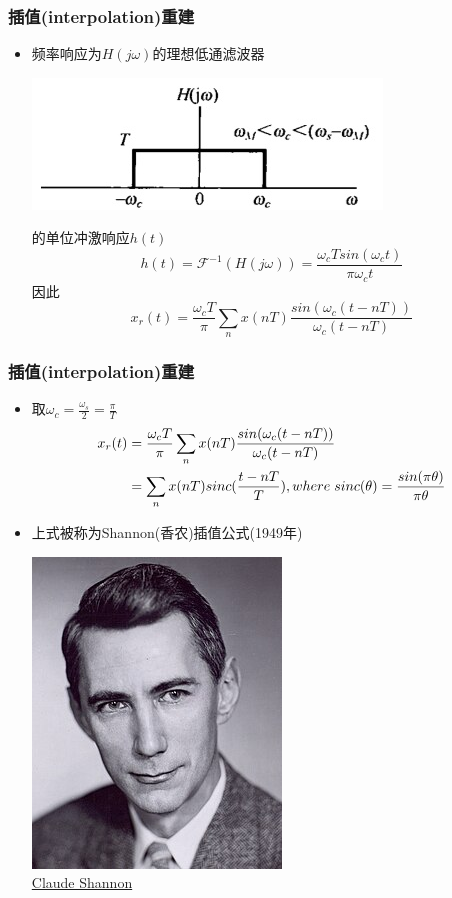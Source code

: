\documentclass[CJKutf8,dvipsnames,table]{beamer}
\begin{document}
\begin{CJK*}{UTF8}{song}
  \begin{frame}
    \frametitle{插值(interpolation)重建}
    \begin{itemize}
    \item 频率响应为$H(j\omega)$的理想低通滤波器
	    \begin{center}
    	\includegraphics[scale=.3]{ss-c-f7-4d}
    	\end{center}
 	的单位冲激响应$h(t)$
	\[
		h(t)=\mathscr{F}^{-1}(H(j\omega))=\frac{\omega_c T sin(\omega_c t)}{\pi\omega_c t}
	\]
	因此
	\[
		x_r(t) = \frac{\omega_c T}{\pi} \sum_n x(nT)\frac{sin(\omega_c(t-nT))}{\omega_c (t-nT)}
	\]
    \end{itemize}
  \end{frame}   
  
  \begin{frame}
    \frametitle{插值(interpolation)重建}
    \begin{itemize}
    \item 取$\omega_c=\frac{\omega_s}{2}=\frac{\pi}{T}$
		\begin{align*}
			x_r(t) & = \frac{\omega_c T}{\pi} \sum_n x(nT)\frac{sin(\omega_c(t-nT))}{\omega_c (t-nT)} \\
		       	   & = \sum_n x(nT)sinc(\frac{t-nT}{T}), where \hspace{1mm} sinc(\theta)=\frac{sin(\pi \theta)}{\pi \theta}
		\end{align*}
	\item 上式被称为Shannon(香农)插值公式(1949年)
		\begin{center}
      	\includegraphics[scale=.3]{Claude_Shannon} \\
    	\href{https://en.wikipedia.org/wiki/Claude_Shannon}{Claude Shannon}   	
	\end{center}
    \end{itemize}
  \end{frame}   
  

\end{CJK*}
\end{document}
